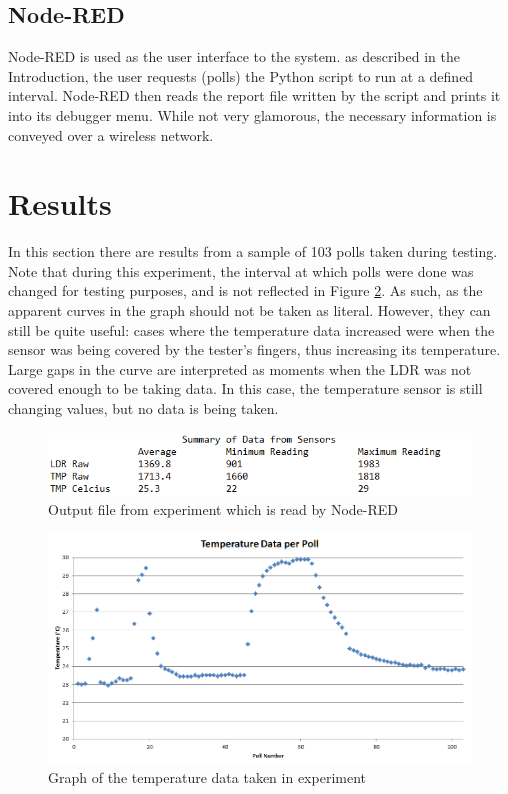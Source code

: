 \documentclass[12pt]{article}
\begin{document}
\subsection{Node-RED}
Node-RED is used as the user interface to the system.  as described in the Introduction, the user requests (polls) the Python script to run at a defined interval.  Node-RED then reads the report file written by the script and prints it into its debugger menu.  While not very glamorous, the necessary information is conveyed over a wireless network.


\newpage

\section{Results} \label{results}

In this section there are results from a sample of 103 polls taken during testing.  Note that during this experiment, the interval at which polls were done was changed for testing purposes, and is not reflected in Figure \ref{fig:results2}.  As such, as the apparent curves in the graph should not be taken as literal.  However, they can still be quite useful: cases where the temperature data increased were when the sensor was being covered by the tester's fingers, thus increasing its temperature.  Large gaps in the curve are interpreted as moments when the LDR was not covered enough to be taking data.  In this case, the temperature sensor is still changing values, but no data is being taken.

\begin{figure}[H]
\begin{center}
\includegraphics[scale=0.9]{reporttxt.png}
\caption{Output file from experiment which is read by Node-RED}
\label{fig:results1}
\end{center}
\end{figure}

\begin{figure}[H]
\begin{center}
\includegraphics[scale=0.6]{graph.png}
\caption{Graph of the temperature data taken in experiment}
\label{fig:results2}
\end{center}
\end{figure}
\end{document}
